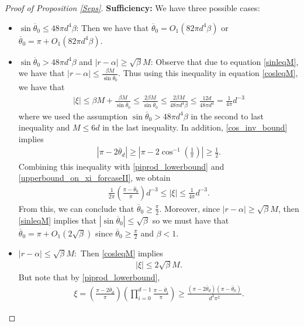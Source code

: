 \documentclass[11pt]{article}
\newcommand{\al}{\alpha}
\theoremstyle{remark}
\begin{document}
\begin{proof}[Proof of Proposition \ref{Seps}]
\textbf{Sufficiency:} We have three possible cases:
\begin{itemize}
\item $\sin \overline{\theta}_0 \leqslant 48\pi d^4\beta$: Then we have that $\overline{\theta}_0 = O_1(82\pi d^4\beta)$ or $\overline{\theta}_0 = \pi + O_1(82\pi d^4\beta)$.
\item $\sin \overline{\theta}_0 > 48 \pi d^4 \beta$ and $|r - \al| \geqslant \sqrt{\beta}M$: Observe that due to equation \eqref{sinleqM}, we have that $|r-\al| \leqslant \frac{\beta M}{\sin \overline{\theta}_0}.$ Thus using this inequality in equation \eqref{cosleqM}, we have that \begin{align}
    |\xi| \leqslant \beta M + \frac{\beta M}{\sin \overline{\theta}_0} \leqslant \frac{2\beta M}{\sin \overline{\theta}_0} \leqslant \frac{2\beta M}{48\pi d^4\beta} \leqslant \frac{12d}{48\pi d^4} = \frac{1}{4\pi}d^{-3} \label{upperbound_on_xi_forcaseII}
\end{align} where we used the assumption $\sin \overline{\theta}_0 > 48\pi d^4\beta$ in the second to last inequality and $M \leqslant 6d$ in the last inequality. In addition, \eqref{cos_inv_bound} implies \begin{align}
|\pi - 2\overline{\theta}_d| \geqslant \left|\pi - 2\cos^{-1}\left(\frac{1}{\pi}\right)\right|  \geqslant \frac{1}{2}. \label{pi_2thetad_geq_half}
\end{align} Combining this inequality with \eqref{piprod_lowerbound} and \eqref{upperbound_on_xi_forcaseII}, we obtain \begin{align*}
\frac{1}{2\pi}\left(\frac{\pi - \overline{\theta}_0}{\pi}\right)d^{-3}\leqslant |\xi|\leqslant \frac{1}{4\pi}d^{-3}.
\end{align*} From this, we can conclude that $\overline{\theta}_0 \geqslant \frac{\pi}{2}.$ Moreover, since $|r - \al| \geqslant \sqrt{\beta}M$, then \eqref{sinleqM} implies that $|\sin \overline{\theta}_0| \leqslant \sqrt{\beta}$ so we must have that $\overline{\theta}_0 = \pi + O_1(2\sqrt{\beta})$ since $\overline{\theta}_0 \geqslant \frac{\pi}{2}$ and $\beta < 1$.
\item $|r - \al| \leqslant \sqrt{\beta}M:$ Then \eqref{cosleqM} implies \begin{align*}
|\xi| \leqslant 2 \sqrt{\beta}M.
\end{align*} But note that by \eqref{piprod_lowerbound}, \begin{align*}
\xi = \left(\frac{\pi - 2\overline{\theta}_d}{\pi}\right)\left(\prod_{i=0}^{d-1}\frac{\pi - \overline{\theta}_i}{\pi}\right) \geqslant \frac{(\pi - 2 \overline{\theta}_d)(\pi - \overline{\theta}_0)}{d^3\pi^2}.

\end{align*}
\end{itemize}
\end{proof}
\end{document}
